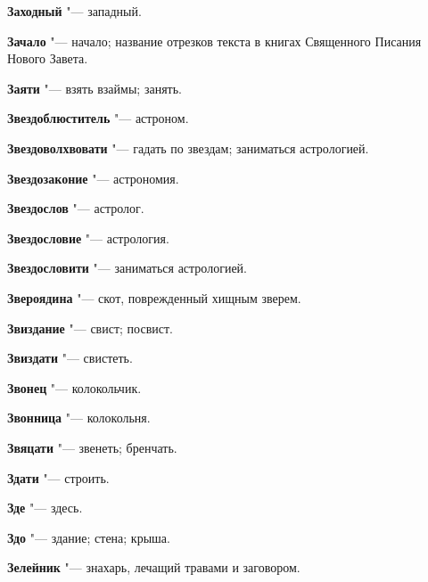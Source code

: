 \begin{mymulticols}{2}
\noindent\textbf{Заходный} "--- западный. 




\noindent\textbf{Зачало} "--- начало; название отрезков текста в книгах Священного Писания Нового Завета. 




\noindent\textbf{Заяти} "--- взять взаймы; занять. 




\noindent\textbf{Звездоблюститель} "--- астроном. 




\noindent\textbf{Звездоволхвовати} "--- гадать по звездам; заниматься астрологией. 




\noindent\textbf{Звездозаконие} "--- астрономия. 




\noindent\textbf{Звездослов} "--- астролог. 




\noindent\textbf{Звездословие} "--- астрология. 




\noindent\textbf{Звездословити} "--- заниматься астрологией. 




\noindent\textbf{Звероядина} "--- скот, поврежденный хищным зверем. 




\noindent\textbf{Звиздание} "--- свист; посвист. 




\noindent\textbf{Звиздати} "--- свистеть. 




\noindent\textbf{Звонец} "--- колокольчик. 




\noindent\textbf{Звонница} "--- колокольня. 




\noindent\textbf{Звяцати} "--- звенеть; бренчать. 




\noindent\textbf{Здати} "--- строить. 




\noindent\textbf{Зде} "--- здесь. 




\noindent\textbf{Здо} "--- здание; стена; крыша. 




\noindent\textbf{Зелейник} "--- знахарь, лечащий травами и заговором. 





\end{mymulticols}
